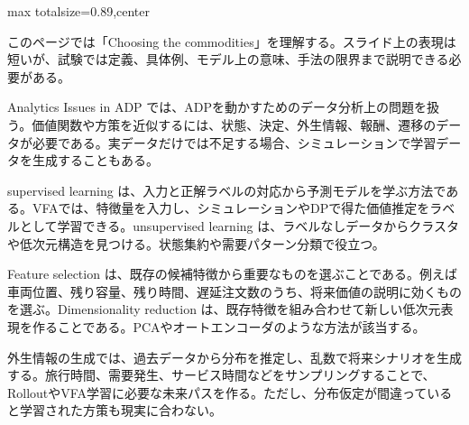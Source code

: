 \begin{minipage}[t]{0.58\textwidth}
\begin{adjustbox}{max totalsize={\textwidth}{0.89\textheight},center}
\begin{minipage}{\textwidth}\scriptsize
{}このページでは「Choosing the commodities」を理解する。スライド上の表現は短いが、試験では定義、具体例、モデル上の意味、手法の限界まで説明できる必要がある。\par
Analytics Issues in ADP では、ADPを動かすためのデータ分析上の問題を扱う。価値関数や方策を近似するには、状態、決定、外生情報、報酬、遷移のデータが必要である。実データだけでは不足する場合、シミュレーションで学習データを生成することもある。\par
supervised learning は、入力と正解ラベルの対応から予測モデルを学ぶ方法である。VFAでは、特徴量を入力し、シミュレーションやDPで得た価値推定をラベルとして学習できる。unsupervised learning は、ラベルなしデータからクラスタや低次元構造を見つける。状態集約や需要パターン分類で役立つ。\par
Feature selection は、既存の候補特徴から重要なものを選ぶことである。例えば車両位置、残り容量、残り時間、遅延注文数のうち、将来価値の説明に効くものを選ぶ。Dimensionality reduction は、既存特徴を組み合わせて新しい低次元表現を作ることである。PCAやオートエンコーダのような方法が該当する。\par
外生情報の生成では、過去データから分布を推定し、乱数で将来シナリオを生成する。旅行時間、需要発生、サービス時間などをサンプリングすることで、RolloutやVFA学習に必要な未来パスを作る。ただし、分布仮定が間違っていると学習された方策も現実に合わない。\par

\end{minipage}
\end{adjustbox}
\end{minipage}
